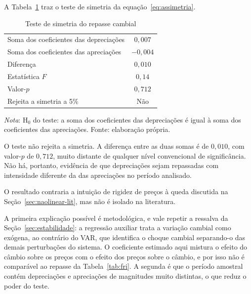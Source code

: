 \documentclass[12pt,openright,oneside,a4paper,portuguese,brazil]{abntex2}
\begin{document}
A Tabela~\ref{tab:assimetria} traz o teste de simetria da
equação~\eqref{eq:assimetria}.

\begin{table}[htbp]
\centering
\caption{Teste de simetria do repasse cambial}
\label{tab:assimetria}
\footnotesize
\begin{tabular}{lc}
\toprule
Soma dos coeficientes das depreciações & $0{,}007$ \\
Soma dos coeficientes das apreciações  & $-0{,}004$ \\
Diferença                              & $0{,}010$ \\
\midrule
Estatística $F$                        & $0{,}14$ \\
Valor-$p$                              & $0{,}712$ \\
Rejeita a simetria a 5\%               & Não \\
\bottomrule
\end{tabular}

\vspace{2pt}
\begin{flushleft}\footnotesize
\textit{Nota}: H$_0$ do teste: a soma dos coeficientes das depreciações é igual
à soma dos coeficientes das apreciações. Fonte: elaboração própria.
\end{flushleft}
\end{table}

O teste não rejeita a simetria. A diferença entre as duas somas é de $0{,}010$,
com valor-$p$ de $0{,}712$, muito distante de qualquer nível convencional de
significância. Não há, portanto, evidência de que depreciações sejam repassadas
com intensidade diferente da das apreciações no período analisado.

O resultado contraria a intuição de rigidez de preços à queda discutida na
Seção~\ref{sec:naolinear-lit}, mas não é isolado na literatura.

A primeira explicação possível é metodológica, e vale repetir a ressalva da
Seção~\ref{sec:estabilidade}: a regressão auxiliar trata a variação cambial
como exógena, ao contrário do VAR, que identifica o choque cambial separando-o
das demais perturbações do sistema. O coeficiente estimado aqui mistura o
efeito do câmbio sobre os preços com o efeito dos preços sobre o câmbio, e por
isso não é comparável ao repasse da Tabela~\ref{tab:fri}. A segunda é que o
período amostral contém depreciações e apreciações de magnitudes muito
distintas, o que reduz o poder do teste.

\end{document}
